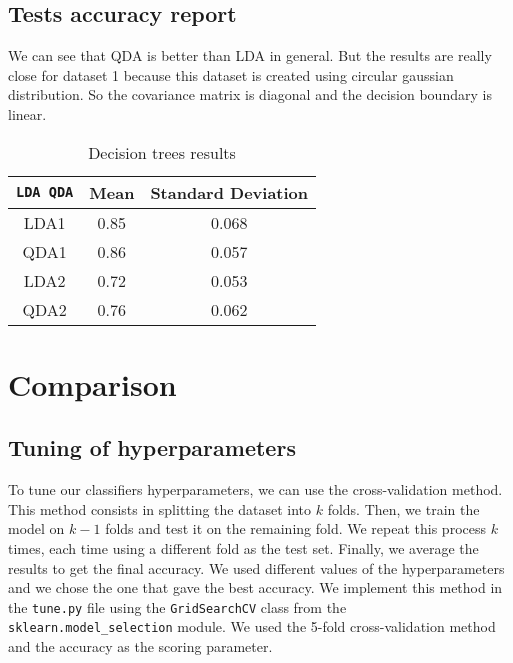 \documentclass[12pt]{article}
\begin{document}
\subsection{Tests accuracy report}
We can see that QDA is better than LDA in general. But the results are really close for dataset 1 because this dataset is created using circular gaussian distribution. 
So the covariance matrix is diagonal and the decision boundary is linear.
	\begin{table}[!h]
		\centering
		\begin{tabular}{|c|c|c|}
		\hline
		\verb|LDA QDA|                      & Mean & Standard Deviation \\ \hline
		LDA1                                & 0.85 & 0.068              \\ \hline
		QDA1                                & 0.86 & 0.057              \\ \hline
		LDA2                                & 0.72 & 0.053              \\ \hline
		QDA2                                & 0.76 & 0.062              \\ \hline
		\end{tabular}
		\caption{Decision trees results}
		\label{tab:results-qdalda}
	\end{table}


\section{Comparison}
\subsection{Tuning of hyperparameters}
	To tune our classifiers hyperparameters, we can use the cross-validation method.
	This method consists in splitting the dataset into $k$ folds.
	Then, we train the model on $k-1$ folds and test it on the remaining fold.
	We repeat this process $k$ times, each time using a different fold as the test set.
	Finally, we average the results to get the final accuracy. We used different values of the hyperparameters and we chose the one that gave the best accuracy.
	We implement this method in the \verb|tune.py| file using
	the \verb|GridSearchCV| class from the \verb|sklearn.model_selection| module. We used the 5-fold cross-validation method and the accuracy as the scoring parameter.
\end{document}
